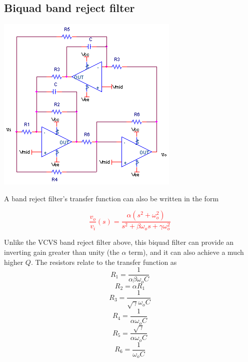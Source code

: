 \subsection{Biquad band reject filter}
\begin{center}
	\includegraphics{schematics/biquad_bandreject.PNG}
\end{center}
A band reject filter's transfer function can also be written in the form 

\textcolor{red}{
\begin{equation}
\frac{v_{o}}{v_{i}}(s) = \frac{\alpha (s^{2} + \omega_{o}^{2})}{s^{2} + \beta \omega_{o}s + \gamma \omega_{o}^{2}}
\label{eq:biquad_bandreject}
\end{equation}
}

Unlike the VCVS band reject filter above, this biquad filter can provide an inverting gain greater than unity (the $\alpha$ term), and it can also achieve a much higher $Q$.
The resistors relate to the transfer function as \autocite[146-148]{op-amp-circuits-johnson}
\begin{equation}
R_1 = \frac{1}{\alpha \beta \omega_{o}C}
\end{equation}
\begin{equation}
R_2 = \alpha R_1
\end{equation}
\begin{equation}
R_3 = \frac{1}{\sqrt{\gamma} \omega_{o}C}
\end{equation}
\begin{equation}
R_4 = \frac{1}{\alpha \omega_{o}C}
\end{equation}
\begin{equation}
R_5 = \frac{\sqrt{\gamma}}{\alpha \omega_{o}C}
\end{equation}
\begin{equation}
R_6 = \frac{1}{\omega_{o}C}
\end{equation}

